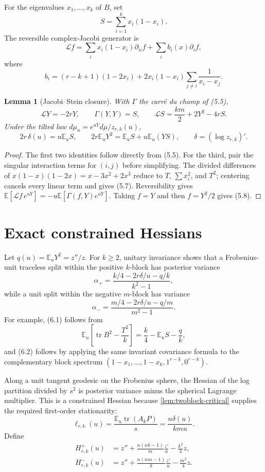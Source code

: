 \documentclass[11pt]{article}
\newtheorem{lemma}[theorem]{Lemma}
\newcommand{\E}{\mathbb E}
\newcommand{\tr}{\operatorname{tr}}
\newcommand{\cL}{\mathcal L}
\begin{document}
For the eigenvalues $x_1,\ldots,x_k$ of $B$, set
\[
 S=\sum_{i=1}^k x_i(1-x_i).                                 \tag{5.4}
\]
The reversible complex-Jacobi generator is
\[
 \cL f=\sum_i x_i(1-x_i)\partial_{ii}f+
 \sum_i b_i(x)\partial_if,                                  \tag{5.5}
\]
where
\[
 b_i=(r-k+1)(1-2x_i)+2x_i(1-x_i)
 \sum_{j\ne i}\frac1{x_i-x_j}.                              \tag{5.6}
\]

\begin{lemma}[Jacobi--Stein closure]\label{lem:stein}
With $\Gamma$ the carré du champ of (5.5),
\[
 \cL Y=-2rY,\qquad \Gamma(Y,Y)=S,\qquad
 \cL S=\frac{km}{2}+2Y^2-4rS.                               \tag{5.7}
\]
Under the tilted law $d\mu_u=e^{uY}d\mu/z_{r,k}(u)$,
\[
 2r\,\delta(u)=u\E_uS,\qquad
 2r\E_uY^2=\E_uS+u\E_u(YS),\qquad \delta=(\log z_{r,k})'. \tag{5.8}
\]
\end{lemma}

\begin{proof}
The first two identities follow directly from (5.5).  For the third,
pair the singular interaction terms for $(i,j)$ before simplifying.  The
divided differences of $x(1-x)(1-2x)=x-3x^2+2x^3$ reduce to $T$,
$\sum x_i^2$, and $T^2$; centering cancels every linear term and gives
(5.7).  Reversibility gives
$\E[\cL f\,e^{uY}]=-u\E[\Gamma(f,Y)e^{uY}]$.  Taking $f=Y$ and then
$f=Y^2/2$ gives (5.8).
\end{proof}

\section{Exact constrained Hessians}

Let $q(u)=\E_uY^2=z''/z$.  For $k\ge2$, unitary invariance shows that a
Frobenius-unit traceless split within the positive $k$-block has posterior
variance
\[
 \alpha_+=\frac{k/4-2r\delta/u-q/k}{k^2-1},                  \tag{6.1}
\]
while a unit split within the negative $m$-block has variance
\[
 \alpha_-=\frac{m/4-2r\delta/u-q/m}{m^2-1}.                  \tag{6.2}
\]
For example, (6.1) follows from
\[
 \E_u\left[\tr B^2-\frac{T^2}{k}\right]
 =\frac k4-\E_uS-\frac{q}{k},                               \tag{6.3}
\]
and (6.2) follows by applying the same invariant covariance formula to
the complementary block spectrum
$(1-x_1,\ldots,1-x_k,1^{r-k},0^{r-k})$.

Along a unit tangent geodesic on the Frobenius sphere, the Hessian of the log
partition divided by $s^2$ is posterior variance minus the spherical
Lagrange multiplier.  This is a constrained Hessian because
\cref{lem:twoblock-critical} supplies the required first-order stationarity:
\[
 \ell_{r,k}(u)=\frac{\E_u\tr(A_kP)}s=\frac{n\delta(u)}{kmu}.                 \tag{6.4}
\]
Define
\[
\begin{aligned}
 H_{r,k}^{+}(u)&=z''+\frac{n(nk-1)}m\frac{z'}u-\frac{k^2}{4}z,\\
 H_{r,k}^{-}(u)&=z''+\frac{n(nm-1)}k\frac{z'}u-\frac{m^2}{4}z.
\end{aligned}                                                \tag{6.5}
\]
\end{document}

